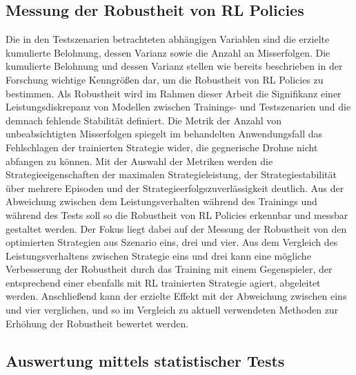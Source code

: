 \subsection{Messung der Robustheit von RL Policies}

Die in den Testszenarien betrachteten abhängigen Variablen sind die erzielte kumulierte Belohnung, dessen Varianz sowie die Anzahl an Misserfolgen.
Die kumulierte Belohnung und dessen Varianz stellen wie bereits beschrieben in der Forschung wichtige Kenngrößen dar, um die Robustheit von RL Policies zu bestimmen.
Als Robustheit wird im Rahmen dieser Arbeit die Signifikanz einer Leistungsdiskrepanz von Modellen zwischen Trainings- und Testszenarien und die demnach fehlende Stabilität definiert.
Die Metrik der Anzahl von unbeabsichtigten Misserfolgen spiegelt im behandelten Anwendungsfall das Fehlschlagen der trainierten Strategie wider, die gegnerische Drohne nicht abfangen zu können.
Mit der Auswahl der Metriken werden die Strategieeigenschaften der maximalen Strategieleistung, der Strategiestabilität über mehrere Episoden und der Strategieerfolgszuverlässigkeit deutlich.
Aus der Abweichung zwischen dem Leistungsverhalten während des Trainings und während des Tests soll so die Robustheit von RL Policies erkennbar und messbar gestaltet werden.
Der Fokus liegt dabei auf der Messung der Robustheit von den optimierten Strategien aus Szenario eins, drei und vier.
Aus dem Vergleich des Leistungsverhaltens zwischen Strategie eins und drei kann eine mögliche Verbesserung der Robustheit durch das Training mit einem Gegenspieler, der entsprechend einer ebenfalls mit RL trainierten Strategie agiert, abgeleitet werden. 
Anschließend kann der erzielte Effekt mit der Abweichung zwischen eins und vier verglichen, und so im Vergleich zu aktuell verwendeten Methoden zur Erhöhung der Robustheit bewertet werden. 

\subsection{Auswertung mittels statistischer Tests}

